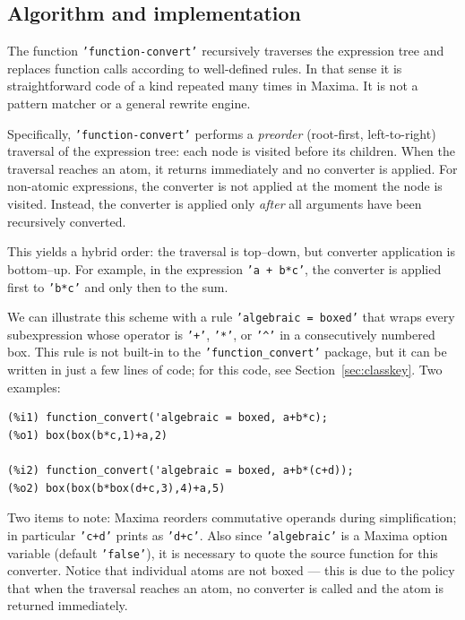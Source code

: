 \documentclass[12pt,fleqn]{extarticle}
\newcommand{\ttq}[1]{\texttt{'#1'}}
\newcommand{\funconvert}{\ttq{function\_convert}{ }}
\newenvironment{maximabox}
  {\begin{tcolorbox}[
      breakable,
      enhanced,
      colback=white,
      colframe=black!8,
      boxrule=0pt,
      borderline west={2.2pt}{0pt}{black!25},
      arc=1pt,
      left=11pt,
      right=7pt,
      top=9pt,
      bottom=9pt,
      before skip=14pt,
      after skip=14pt
    ]}
  {\end{tcolorbox}}
\begin{document}
\subsection{Algorithm and implementation}
\label{sec:algorithm}

The function \ttq{function-convert} recursively traverses the expression tree 
and replaces function calls according to well-defined
rules.  In that sense it is straightforward code of a kind repeated
many times in Maxima.  It is not a pattern matcher or a general
rewrite engine.

Specifically, \ttq{function-convert} performs a \emph{preorder} (root-first, left-to-right) traversal of the expression tree: each node is visited before its children. When the traversal reaches an atom, it returns immediately and no converter is applied. For non-atomic expressions, the converter is not applied at the moment the node is visited. Instead, the converter is applied only \emph{after} all arguments have been recursively converted.

This yields a hybrid order: the traversal is top--down, but converter
application is bottom--up.  For example, in the expression
\ttq{a + b*c}, the converter is applied first to \ttq{b*c} and only
then to the sum.

We can illustrate this scheme with a rule  \ttq{algebraic = boxed} that
wraps every subexpression whose operator is \ttq{+}, \ttq{*}, or
\ttq{\^{}} in a consecutively numbered box.  This rule is not built-in to the 
\funconvert package, but it can be written in just a few lines of code; for this code, 
see Section~\ref{sec:classkey}. Two examples:

\begin{maximabox}
\begin{verbatim}
(%i1) function_convert('algebraic = boxed, a+b*c);
(%o1) box(box(b*c,1)+a,2)

(%i2) function_convert('algebraic = boxed, a+b*(c+d));
(%o2) box(box(b*box(d+c,3),4)+a,5)
\end{verbatim}
\end{maximabox}
\noindent Two items to note: Maxima reorders commutative operands during simplification; in particular \ttq{c+d}
prints as \ttq{d+c}. Also since \ttq{algebraic} is a Maxima option variable (default \ttq{false}),
it is necessary to quote the source function for this converter. Notice that individual atoms are not boxed --- this is due to the policy that when the traversal reaches an atom, no converter is called and
the atom is returned immediately.
\end{document}
